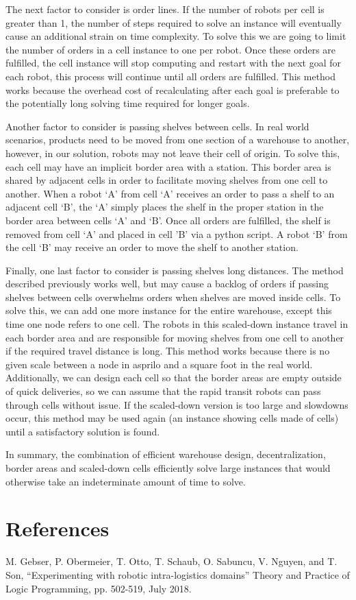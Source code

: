 \documentclass[12pt]{article}
\begin{document}
The next factor to consider is order lines. If the number of robots per cell is greater than 1, the number of steps required to solve an instance will eventually cause an additional strain on time complexity. To solve this we are going to limit the number of orders in a cell instance to one per robot. Once these orders are fulfilled, the cell instance will stop computing and restart with the next goal for each robot, this process will continue until all orders are fulfilled. This method works because the overhead cost of recalculating after each goal is preferable to the potentially long solving time required for longer goals.

Another factor to consider is passing shelves between cells. In real world scenarios, products need to be moved from one section of a warehouse to another, however, in our solution, robots may not leave their cell of origin. To solve this, each cell may have an implicit border area with a station. This border area is shared by adjacent cells in order to facilitate moving shelves from one cell to another. When a robot ‘A’ from cell ‘A’ receives an order to pass a shelf to an adjacent cell ‘B’, the ‘A’ simply places the shelf in the proper station in the border area between cells ‘A’ and ‘B’. Once all orders are fulfilled, the shelf is removed from cell ‘A’ and placed in cell ’B’ via a python script. A robot ‘B’ from the cell ‘B’ may receive an order to move the shelf to another station.

Finally, one last factor to consider is passing shelves long distances. The method described previously works well, but may cause a backlog of orders if passing shelves between cells overwhelms orders when shelves are moved inside cells. To solve this, we can add one more instance for the entire warehouse, except this time one node refers to one cell. The robots in this scaled-down instance travel in each border area and are responsible for moving shelves from one cell to another if the required travel distance is long.  This method works because there is no given scale between a node in asprilo and a square foot in the real world. Additionally, we can design each cell so that the border areas are empty outside of quick deliveries, so we can assume that the rapid transit robots can pass through cells without issue. If the scaled-down version is too large and slowdowns occur, this method may be used again (an instance showing cells made of cells) until a satisfactory solution is found.

In summary, the combination of efficient warehouse design, decentralization, border areas and scaled-down cells efficiently solve large instances that would otherwise take an indeterminate amount of time to solve.  



\section*{References}

M. Gebser, P. Obermeier, T. Otto, T. Schaub, O. Sabuncu, V. Nguyen, and T. Son, “Experimenting with robotic intra-logistics domains” Theory and Practice of Logic Programming, pp. 502-519, July 2018.
\end{document}
